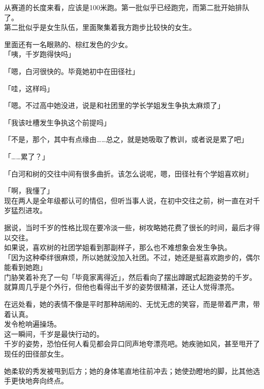 从赛道的长度来看，应该是100米跑。第一批似乎已经跑完，而第二批开始排队了。\\

第二批似乎是女生队伍，里面聚集着我方跑步比较快的女生。

里面还有一名眼熟的、棕红发色的少女。\\

「咦，千岁跑得快吗」

「嗯，白河很快的。毕竟她初中在田径社」

「哇，这样吗」

「嗯。不过高中她没进，说是和社团里的学长学姐发生争执太麻烦了」

「我该吐槽发生争执这个前提吗」

「不是，那个，其中有点缘由……总之，就是她吸取了教训，或者说是累了吧」

「……累了？」

「白河和树的交往中间有很多曲折。该怎么说呢，嗯，田径社有个学姐喜欢树」

「啊，我懂了」\\

现在两人是全年级都认可的情侣，但听当事人说，在初中交往之前，树一直在对千岁猛烈进攻。

据说，当时千岁的性格比现在要冷淡一些，树攻略她花费了很长的时间，最后才得以交往。\\

如果说，喜欢树的社团学姐看到那副样子，那么也不难想象会发生争执。\\

「因为这种牵绊很麻烦，所以她就没加入社团。不过，她还是挺喜欢跑步的，偶尔能看到她跑」\\

门胁笑着补充了一句「毕竟家离得近」，然后看向了摆出蹲踞式起跑姿势的千岁。\\

就算周几乎是个外行，但他也看得出千岁的姿势很精湛，还让人觉得漂亮。

在远处看，她的表情不像是平时那种胡闹的、无忧无虑的笑容，而是带着严肃，带着认真。\\

发令枪响遍操场。\\

这一瞬间，千岁是最快行动的。\\

千岁的姿势，恐怕任何人看见都会异口同声地夸漂亮吧。她疾驰如风，甚至甩开了现任的田径部女生。

她柔软的秀发被甩到后方；她的身体笔直地往前冲去；她使劲瞪地的脚，比其他选手更快地奔向终点。\\

